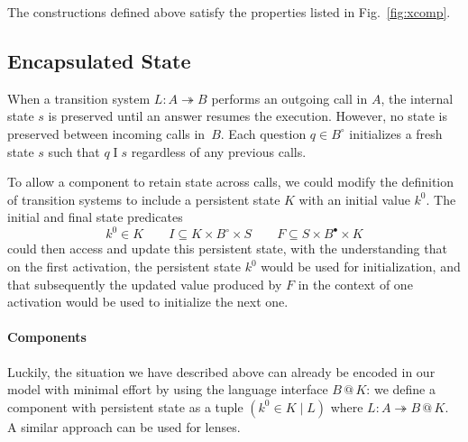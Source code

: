 \documentclass[acmsmall,screen,review,anonymous]{acmart}
\newcommand{\que}{\circ}
\newcommand{\ans}{\bullet}
\newcommand{\intl}[1]{#1^0}
\begin{document}
\begin{theorem} %
The constructions defined above
satisfy the properties listed in Fig.~\ref{fig:xcomp}.
\end{theorem}


\subsection{Encapsulated State} \label{sec:encap} %

When a transition system $L : A \twoheadrightarrow B$
performs an outgoing call in $A$,
the internal state $s$ is preserved
until an answer resumes the execution.
However,
no state is preserved between incoming calls in~$B$.
Each question $q \in B^\que$ initializes a fresh state $s$
such that $q \mathrel{I} s$
regardless of any previous calls. %

To allow a component to retain state across calls,
we could modify the definition of transition systems
to include a persistent state $K$ with an initial value $\intl{k}$.
The initial and final state predicates
\begin{equation} \label{eqn:psts}
  \intl{k} \in K
  \qquad
  I \subseteq K \times B^\que \times S
  \qquad
  F \subseteq S \times B^\ans \times K
\end{equation}
could then access and update this persistent state,
with the understanding that on the first activation,
the persistent state $\intl{k}$ would be used for initialization,
and that subsequently the updated value produced by $F$
in the context of one activation
would be used to initialize the next one.

\paragraph{Components} %

Luckily,
the situation we have described above
can already be encoded in our model with minimal effort
by using the language interface $B \mathbin@ K$:
we define a component with persistent state as a tuple
$(\intl{k} \in K \mid L)$
where
$L : A \twoheadrightarrow B \mathbin@ K$.
A similar approach can be used for lenses.
\end{document}
